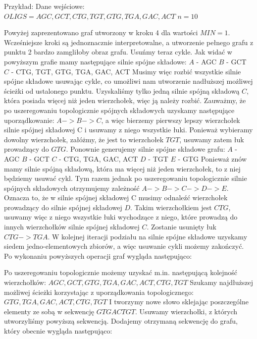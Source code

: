 \documentclass[a4paper,10pt]{article}
\begin{document}
Przykład:
Dane wejściowe:
$OLIGS = { AGC, GCT, CTG, TGT, GTG, TGA, GAC, ACT }$
$n = 10$


Powyżej zaprezentowano graf utworzony w kroku 4 dla wartości $MIN=1$. Wcześniejsze kroki są jednoznacznie interpretowalne, a utworzenie pełnego grafu z punktu 2 bardzo zamgliłoby obraz grafu. Usuńmy teraz cykle.
Jak widać w powyższym grafie mamy następujące silnie spójne składowe:
$A$ - {AGC}
$B$ - {GCT}
$C$ - {CTG, TGT, GTG, TGA, GAC, ACT}
Musimy więc rozbić wszystkie silnie spójne składowe usuwając cykle, co umożliwi nam utworzenie nadłuższej możliwej ścieżki od ustalonego punktu.
Uzyskaliśmy tylko jedną silnie spójną składową $C$, która posiada więcej niż jeden wierzchołek, więc ją należy rozbić. Zauważmy, że po uszeregowaniu topologicznie spójnych składowych uzyskamy następujące uporządkowanie: $A->B->C$, a więc bierzemy pierwszy lepszy wierzchołek silnie spójnej składowej C i usuwamy z niego wszystkie łuki. Ponieważ wybieramy dowolny wierzchołek, załóżmy, że jest to wierzchołek $TGT$, usuwamy zatem łuk prowadzący do $GTG$.
Ponownie generujemy silnie spójne składowe grafu:
$A$ - {AGC}
$B$ - {GCT}
$C$ - {CTG, TGA, GAC, ACT}
$D$ - {TGT}
$E$ - {GTG}
Ponieważ znów mamy silnie spójną składową, która ma więcej niż jeden wierzchołek, to z niej będziemy usuwać cykl. Tym razem jednak po uszeregowaniu topologicznie silnie spójnych składowych otrzymujemy zależność $A->B->C->D->E$. Oznacza to, że w silnie spójnej składowej C musimy odnaleźć wierzchołek prowadzący do silnie spójnej składowej $D$. Takim wierzchołkiem jest $CTG$, usuwamy więc z niego wszystkie łuki wychodzące z niego, które prowadzą do innych wierzchołków silnie spójnej składowej $C$. Zostanie usunięty łuk $CTG->TGA$.
W kolejnej iteracji podziału na silnie spójne składowe uzyskamy siedem jedno-elementowych zbiorów, a więc usuwanie cykli możemy zakończyć. Po wykonaniu powyższych operacji graf wygląda następująco:


Po uszeregowaniu topologicznie możemy uzyskać m.in. następującą kolejność wierzchołków:
$AGC, GCT, GTG, TGA, GAC, ACT, CTG, TGT$
Szukamy najdłuższej możliwej ścieżki korzystając z uporządkowania topologicznego:
$GTG, TGA, GAC, ACT, CTG, TGT$
I tworzymy nowe słowo sklejając poszczególne elementy ze sobą w sekwencję $GTGACTGT$.
Usuwamy wierzchołki, z których utworzyliśmy powyższą sekwencją. Dodajemy otrzymaną sekwencję do grafu, który obecnie wygląda następująco:
\end{document}
